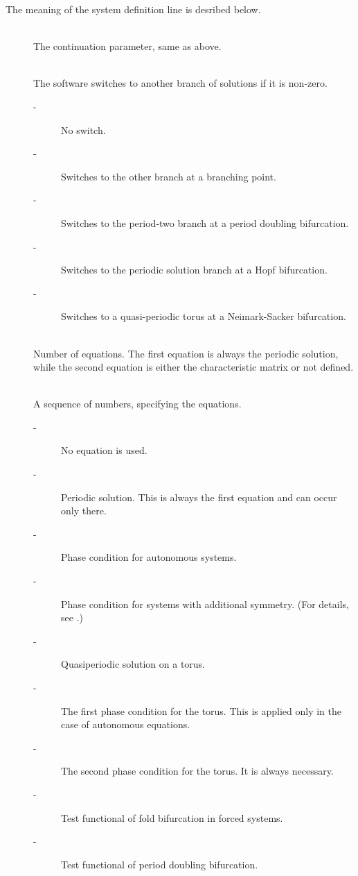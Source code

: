\documentclass[10pt,a4paper]{ddedoc}
\begin{document}
The meaning of the system definition line is desribed below.
\begin{description}
\item[] ~\\
	The continuation parameter, same as above.
%
\item[] ~\\
	The software switches to another branch of solutions if it is non-zero.
\begin{description}
\item[ -] No switch.
\item[ -] Switches to the other branch at a branching point. %
\item[ -] Switches to the period-two branch at a period doubling bifurcation.
\item[ -] Switches to the periodic solution branch at a Hopf bifurcation.
\item[ -] Switches to a quasi-periodic torus at a Neimark-Sacker bifurcation.
\end{description}
\item[] ~\\
	Number of equations. The first equation is always the periodic solution, 
	while the second equation is either the characteristic matrix or not defined.
\item[] ~\\
	A sequence of numbers, specifying the equations.
\begin{description}
\item[ -] No equation is used.
\item[ -] Periodic solution. This is always the first equation and can occur only there.
\item[ -] Phase condition for autonomous systems.
\item[ -] Phase condition for systems with additional symmetry. (For details, see \cite{haegeman}.)
\item[ -] Quasiperiodic solution on a torus.
\item[ -] The first phase condition for the torus. This is applied only in the case of autonomous equations.
\item[ -] The second phase condition for the torus. It is always necessary.
\item[ -] Test functional of fold bifurcation in forced systems.
\item[ -] Test functional of period doubling bifurcation.

\end{description}
\end{description}
\end{document}

